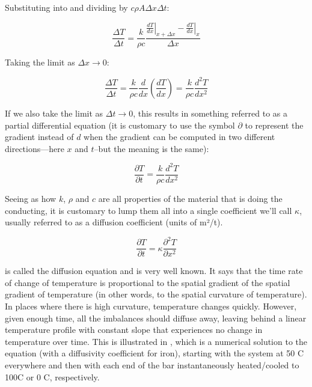 Substituting into  and dividing by $c \rho A \Delta x \Delta t$:

\begin{equation} \label{eq:tempgradient} 
\frac{\Delta T}{\Delta t} =\frac{k}{\rho c}\frac{\left. \frac{dT}{dx}\right|_{x+\Delta x}-\left. \frac{dT}{dx}\right|_{x}}{\Delta x}
\end{equation}

Taking the limit as $\Delta x \rightarrow 0 $:

\begin{equation} \label{eq:secondderivative} 
\frac{\Delta T}{\Delta t}=\frac{k}{\rho c}\frac{d}{dx}\left ( \frac{dT}{dx} \right )=\frac{k}{\rho c}\frac{d^{2}T}{dx^2}
\end{equation}

If we also take the limit as $\Delta t \rightarrow 0$, this results in something referred to as a partial differential equation (it is customary to use the symbol $\partial$ to represent the gradient instead of $d$ when the gradient can be computed in two different directions—here $x$ and $t$--but the meaning is the same):

\begin{equation} \label{eq:diffusion1} 
\frac{\partial T}{\partial t}=\frac{k}{\rho c}\frac{d^{2}T}{dx^2} 
\end{equation}

Seeing as how $k$, $\rho$ and $c$ are all properties of the material that is doing the conducting, it is customary to lump them all into a single coefficient we’ll call $\kappa$, usually referred to as a diffusion coefficient (units of m²/t).  

\begin{equation} \label{eq:diffusion} 
\frac{\partial T}{\partial t}=\kappa \frac{\partial ^{2}T}{\partial x^2} 
\end{equation}

 is called the diffusion equation and is very well known.  It says that the time rate of change of temperature is proportional to the spatial gradient of the spatial gradient of temperature (in other words, to the spatial curvature of temperature).  In places where there is high curvature, temperature changes quickly.  However, given enough time, all the imbalances should diffuse away, leaving behind a linear temperature profile with constant slope that experiences no change in temperature over time.  This is illustrated in , which is a numerical solution to the equation (with a diffusivity coefficient for iron), starting with the system at 50 \textdegree C everywhere and then with each end of the bar instantaneously heated/cooled to 100\textdegree C or 0 \textdegree C, respectively.  

